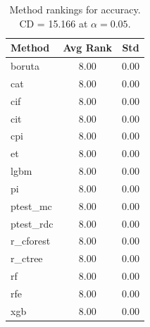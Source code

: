 \begin{table}[h]
\centering
\caption{Method rankings for accuracy. CD = 15.166 at $\alpha=0.05$.}
\label{tab:ranks_accuracy}
\begin{tabular}{lcc}
\toprule
Method & Avg Rank & Std \\
\midrule
boruta & 8.00 & 0.00 \\
cat & 8.00 & 0.00 \\
cif & 8.00 & 0.00 \\
cit & 8.00 & 0.00 \\
cpi & 8.00 & 0.00 \\
et & 8.00 & 0.00 \\
lgbm & 8.00 & 0.00 \\
pi & 8.00 & 0.00 \\
ptest_mc & 8.00 & 0.00 \\
ptest_rdc & 8.00 & 0.00 \\
r_cforest & 8.00 & 0.00 \\
r_ctree & 8.00 & 0.00 \\
rf & 8.00 & 0.00 \\
rfe & 8.00 & 0.00 \\
xgb & 8.00 & 0.00 \\
\bottomrule
\end{tabular}
\end{table}